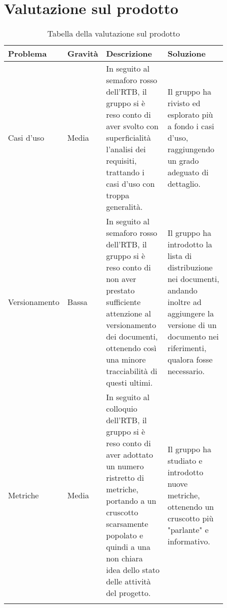 \section{Valutazione sul prodotto}
\begin{center}
    \renewcommand{\arraystretch}{1.25}
\begin{table}[H]
    \centering
    \begin{longtable}{|p{0.16\linewidth}|p{0.11\linewidth}|p{0.3\linewidth}|p{0.3\linewidth}|}
   \hline
    \rowcolor[HTML]{036400}
    {\color[HTML]{EFEFEF} \textbf{Problema}} & {\color[HTML]{EFEFEF} \textbf{Gravità}} & {\color[HTML]{EFEFEF} \textbf{Descrizione}} & {\color[HTML]{EFEFEF} \textbf{Soluzione}} \\ \hline
    \rowcolor[HTML]{EFEFEF}
    Casi d'uso & Media & In seguito al semaforo rosso dell'RTB, il gruppo si è reso conto di aver svolto con superficialità l'analisi dei requisiti, trattando i casi d'uso con troppa generalità. & Il gruppo ha rivisto ed esplorato più a fondo i casi d'uso, raggiungendo un grado adeguato di dettaglio. \\ \hline
    \rowcolor[HTML]{C0C0C0}
    Versionamento & Bassa & In seguito al semaforo rosso dell'RTB, il gruppo si è reso conto di non aver prestato sufficiente attenzione al versionamento dei documenti, ottenendo così una minore tracciabilità di questi ultimi. & Il gruppo ha introdotto la lista di distribuzione nei documenti, andando inoltre ad aggiungere la versione di un documento nei riferimenti, qualora fosse necessario.  \\ \hline
    \rowcolor[HTML]{EFEFEF}
    Metriche & Media & In seguito al colloquio dell'RTB, il gruppo si è reso conto di aver adottato un numero ristretto di metriche, portando a un cruscotto scarsamente popolato e quindi a una non chiara idea dello stato delle attività del progetto. & Il gruppo ha studiato e introdotto nuove metriche, ottenendo un cruscotto più "parlante" e informativo. \\ \hline
    \caption{Tabella della valutazione sul prodotto}
    \end{longtable}

\end{table}
\end{center}

